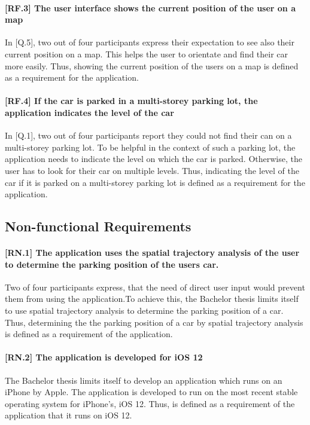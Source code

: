 \paragraph{[RF.3] The user interface shows the current position of the user on a map}
In [Q.5], two out of four participants express their expectation to see also their current position on a map. This helps the user to orientate and find their car more easily. Thus, showing the current position of the users on a map is defined as a requirement for the application.

\paragraph{[RF.4] If the car is parked in a multi-storey parking lot, the application indicates the level of the car}
In [Q.1], two out of four participants report they could not find their can on a multi-storey parking lot. To be helpful in the context of such a parking lot, the application needs to indicate the level on which the car is parked. Otherwise, the user has to look for their car on multiple levels. Thus, indicating the level of the car if it is parked on a multi-storey parking lot is defined as a requirement for the application.

\subsection{Non-functional Requirements}

\paragraph{[RN.1] The application uses the spatial trajectory analysis of the user to determine the parking position of the users car.}
Two of four participants express, that the need of direct user input would prevent them from using the application.To achieve this, the Bachelor thesis limits itself to use spatial trajectory analysis to determine the parking position of a car. Thus, determining the the parking position of a car by spatial trajectory analysis is defined as a requirement of the application.

\paragraph{[RN.2] The application is developed for iOS 12}
The Bachelor thesis limits itself to develop an application which runs on an iPhone by Apple. The application is developed to run on the most recent stable operating system for iPhone's, iOS 12. Thus, is defined as a requirement of the application that it runs on iOS 12.

